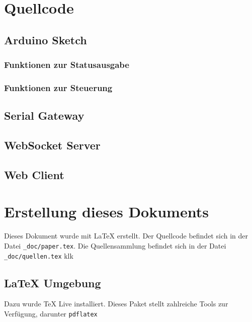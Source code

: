 \appendix{}
\section{Quellcode}
\subsection{Arduino Sketch} \label{Arduino Sketch}

\subsubsection{Funktionen zur Statusausgabe}

\subsubsection{Funktionen zur Steuerung}


\newpage
\subsection{Serial Gateway} \label{Serial Gateway}


\newpage
\subsection{WebSocket Server} \label{WebSocket Server}


\newpage
\subsection{Web Client} \label{Web Client}


\newpage
\section{Erstellung dieses Dokuments}
Dieses Dokument wurde mit LaTeX erstellt. Der Quellcode befindet sich in der Datei
\verb|_doc/paper.tex|. Die Quellensammlung befindet sich in der Datei \verb|_doc/quellen.tex| klk

\subsection{LaTeX Umgebung}
Dazu wurde TeX Live \cite{texlive} installiert. Dieses
Paket stellt zahlreiche Tools zur Verfügung, darunter  \verb|pdflatex|


